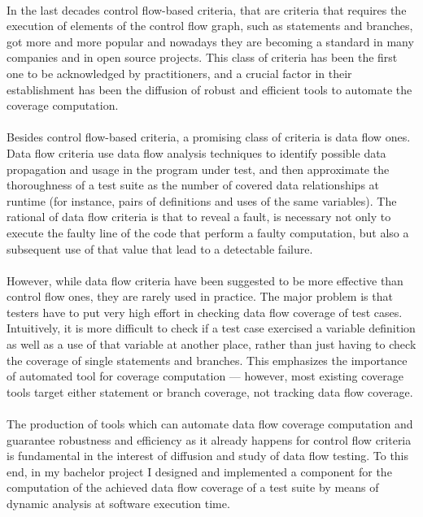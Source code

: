 \paragraph{}
In the last decades control flow-based criteria, that are criteria that requires the execution of elements of the control flow graph, such as statements and 
branches, got more and more popular and nowadays they are becoming a standard in many companies and in open source projects. This class of criteria has been the first one to be acknowledged by practitioners, and a crucial factor in their establishment has been the diffusion of robust and efficient tools to automate the coverage computation. 

\paragraph{}
Besides control flow-based criteria, a promising class of criteria is 
data flow ones. Data flow criteria use data flow analysis techniques to identify possible data propagation and usage in the program under test, and then approximate the thoroughness of a test suite as the number of covered data relationships at runtime (for instance, pairs of definitions and uses of the same variables). The rational of data flow criteria is that to reveal a fault, is necessary not only to execute the faulty line of the code that perform a faulty computation, but also a subsequent use of that value that lead to a detectable failure. 

\paragraph{}
However, while data flow criteria have been suggested to be more effective than control flow ones, they are rarely used in practice.
The major problem is that testers have to put very high effort in checking data flow coverage of test cases. Intuitively, it is more difficult to check if a test case exercised a variable definition as well as a use of that variable at another place, rather than just having to check the coverage of single statements and branches. This emphasizes the importance of automated tool for coverage computation --- however, most existing coverage tools target either statement or branch coverage, not tracking data flow coverage.

\paragraph{}
The production of tools which can automate data flow coverage computation 
and guarantee robustness and efficiency as it already happens for control flow 
criteria is fundamental in the interest of diffusion and study of data flow testing. To this end, in my bachelor project I designed and implemented a component for the computation of 
the achieved data flow coverage of a test suite by means of dynamic analysis at software execution time.

